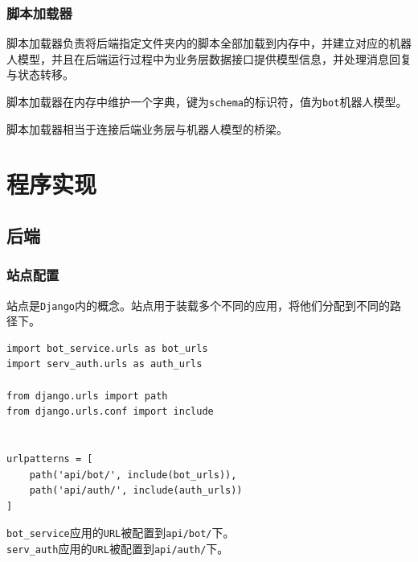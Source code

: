 \documentclass[hyperref]{ctexart}
\begin{document}
\subsubsection{脚本加载器}
脚本加载器负责将后端指定文件夹内的脚本全部加载到内存中，并建立对应的机器人模型，并且在后端运行过程中为业务层数据接口提供模型信息，并处理消息回复与状态转移。
\par 脚本加载器在内存中维护一个字典，键为\texttt{schema}的标识符，值为\texttt{bot}机器人模型。
\par 脚本加载器相当于连接后端业务层与机器人模型的桥梁。
\section{程序实现}
\subsection{后端}
\subsubsection{站点配置}
站点是\texttt{Django}内的概念。站点用于装载多个不同的应用，将他们分配到不同的路径下。
\lstset{
    language=python
}
\begin{lstlisting}
import bot_service.urls as bot_urls
import serv_auth.urls as auth_urls

from django.urls import path
from django.urls.conf import include


urlpatterns = [
    path('api/bot/', include(bot_urls)),
    path('api/auth/', include(auth_urls))
]
\end{lstlisting}
\texttt{bot\_service}应用的\texttt{URL}被配置到\texttt{api/bot/}下。\\
\texttt{serv\_auth}应用的\texttt{URL}被配置到\texttt{api/auth/}下。
\end{document}
